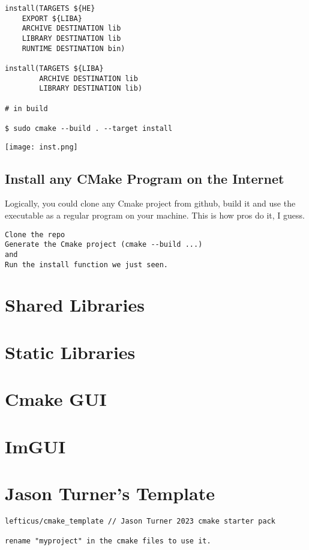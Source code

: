 \begin{verbatim}
install(TARGETS ${HE}
    EXPORT ${LIBA}
    ARCHIVE DESTINATION lib
    LIBRARY DESTINATION lib
    RUNTIME DESTINATION bin) 

install(TARGETS ${LIBA}
        ARCHIVE DESTINATION lib
        LIBRARY DESTINATION lib)

# in build

$ sudo cmake --build . --target install
\end{verbatim}


\begin{center}
    \texttt{[image: inst.png]}
\end{center}

\subsection{Install any CMake Program on the Internet}

Logically, you could clone any Cmake project from github, build it and use the executable as a regular
program on your machine. This is how pros do it, I guess.


\begin{verbatim}
Clone the repo
Generate the Cmake project (cmake --build ...)
and
Run the install function we just seen.
\end{verbatim}


\section{Shared Libraries}

\section{Static Libraries}
\section{Cmake GUI}

\section{ImGUI}



\section{Jason Turner's Template}

\begin{verbatim}
lefticus/cmake_template // Jason Turner 2023 cmake starter pack

rename "myproject" in the cmake files to use it.

\end{verbatim}

